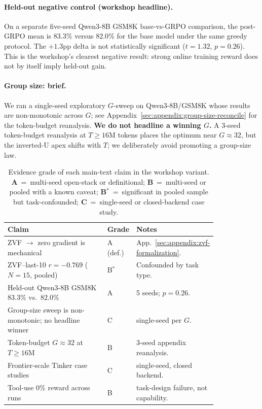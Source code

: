 \documentclass{article}
\begin{document}
\paragraph{Held-out negative control (workshop headline).}
On a separate five-seed Qwen3-8B GSM8K base-vs-GRPO comparison, the post-GRPO
mean is $83.3\%$ versus $82.0\%$ for the base model under the same greedy
protocol. The $+1.3$pp delta is not statistically significant
($t{=}1.32$, $p{=}0.26$). This is the workshop's clearest negative result:
strong online training reward does not by itself imply held-out gain.

\paragraph{Group size: brief.}
We ran a single-seed exploratory $G$-sweep on Qwen3-8B/GSM8K whose results
are non-monotonic across $G$; see
Appendix~\ref{sec:appendix:group-size-reconcile} for the token-budget
reanalysis. \textbf{We do not headline a winning $G$.} A 3-seed
token-budget reanalysis at $T{\ge}16$M tokens places the optimum near
$G{\approx}32$, but the inverted-U apex shifts with $T$; we deliberately
avoid promoting a group-size law.

\begin{table}[htbp]
\centering\small
\setlength{\tabcolsep}{4pt}
\caption{Evidence grade of each main-text claim in the workshop variant.
\textbf{A}~=~multi-seed open-stack or definitional;
\textbf{B}~=~multi-seed or pooled with a known caveat;
\textbf{B$^{*}$}~=~significant in pooled sample but task-confounded;
\textbf{C}~=~single-seed or closed-backend case study.}
\label{tab:evidence-grade}
\begin{tabular}{@{}p{0.50\linewidth} l p{0.32\linewidth}@{}}
\toprule
\textbf{Claim} & \textbf{Grade} & \textbf{Notes} \\
\midrule
ZVF $\to$ zero gradient is mechanical & A (def.) & App.~\ref{sec:appendix:zvf-formalization}. \\
ZVF--last-10 $r{=}-0.769$ ($N{=}15$, pooled) & B$^{*}$ & Confounded by task type. \\
Held-out Qwen3-8B GSM8K $83.3\%$ vs.\ $82.0\%$ & A & 5 seeds; $p{=}0.26$. \\
Group-size sweep is non-monotonic; no headline winner & C & single-seed per $G$. \\
Token-budget $G{\approx}32$ at $T{\ge}16$M & B & 3-seed appendix reanalysis. \\
Frontier-scale Tinker case studies & C & single-seed, closed backend. \\
Tool-use $0\%$ reward across runs & B & task-design failure, not capability. \\
\bottomrule
\end{tabular}
\end{table}
\end{document}
